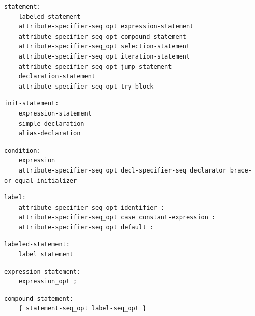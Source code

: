 \noindent\textbf{\texttt{}}\par
\begin{lstlisting}
statement:
    labeled-statement
    attribute-specifier-seq_opt expression-statement
    attribute-specifier-seq_opt compound-statement
    attribute-specifier-seq_opt selection-statement
    attribute-specifier-seq_opt iteration-statement
    attribute-specifier-seq_opt jump-statement
    declaration-statement
    attribute-specifier-seq_opt try-block
\end{lstlisting}

\noindent\textbf{\texttt{}}\par
\begin{lstlisting}
init-statement:
    expression-statement
    simple-declaration
    alias-declaration
\end{lstlisting}

\noindent\textbf{\texttt{}}\par
\begin{lstlisting}
condition:
    expression
    attribute-specifier-seq_opt decl-specifier-seq declarator brace-or-equal-initializer
\end{lstlisting}

\noindent\textbf{\texttt{}}\par
\begin{lstlisting}
label:
    attribute-specifier-seq_opt identifier :
    attribute-specifier-seq_opt case constant-expression :
    attribute-specifier-seq_opt default :
\end{lstlisting}

\noindent\textbf{\texttt{}}\par
\begin{lstlisting}
labeled-statement:
    label statement
\end{lstlisting}

\noindent\textbf{\texttt{}}\par
\begin{lstlisting}
expression-statement:
    expression_opt ;
\end{lstlisting}

\noindent\textbf{\texttt{}}\par
\begin{lstlisting}
compound-statement:
    { statement-seq_opt label-seq_opt }
\end{lstlisting}

